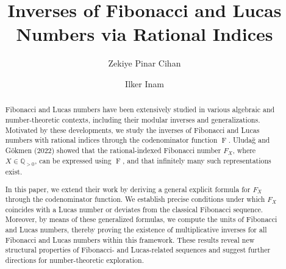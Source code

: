 \documentclass[11pt,reqno]{amsart}
\title[Inverses of Fibonacci and Lucas Numbers]
{Inverses of Fibonacci and Lucas Numbers via Rational Indices}
\author{Zekiye Pinar Cihan}
\author{Ilker Inam}
\numberwithin{equation}{section}
\numberwithin{table}{section}
\numberwithin{figure}{section}
\DeclareMathOperator{\F}{F}
\theoremstyle{plain}
\theoremstyle{definition}
\theoremstyle{remark}
\begin{document}
\begin{abstract}
Fibonacci and Lucas numbers have been extensively studied in various algebraic and number-theoretic contexts, including their modular inverses and generalizations. Motivated by these developments, we study the inverses of Fibonacci and Lucas numbers with rational indices through the codenominator function $\F$. Uludağ and Gökmen (2022) showed that the rational-indexed Fibonacci number $F_X$, where $X\in\mathbb{Q}_{>0}$, can be expressed using $\F$, and that infinitely many such representations exist.

In this paper, we extend their work by deriving a general explicit formula for $F_X$ through the codenominator function. We establish precise conditions under which $F_X$ coincides with a Lucas number or deviates from the classical Fibonacci sequence. Moreover, by means of these generalized formulas, we compute the units of Fibonacci and Lucas numbers, thereby proving the existence of multiplicative inverses for all Fibonacci and Lucas numbers within this framework. These results reveal new structural properties of Fibonacci- and Lucas-related sequences and suggest further directions for number-theoretic exploration.
\end{abstract}

\maketitle
\end{document}
